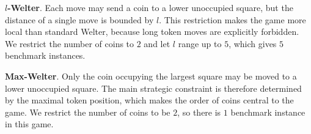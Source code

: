 \documentclass[review]{elsarticle}
\newcommand{\set}[1]{\{ #1 \}}
\newcommand{\tuple}[1]{\langle {#1} \rangle}
\newcommand{\true}{\top}
\newcommand{\statevar}{\mathcal{X}}
\newcommand{\act}{\mathcal{A}}
\newcommand{\constraint}{\mathcal{C}}
\newcommand{\estate}{\mathcal{E}}
\newcommand{\pre}{\mathtt{pre}}
\newcommand{\eff}{\mathtt{eff}}
\begin{document}
\textbf{$l$-Welter}. Each move may send a coin to a lower unoccupied square, but the distance of a single move is bounded by $l$.
This restriction makes the game more local than standard Welter, because long token moves are explicitly forbidden.
We restrict the number of coins to $2$ and let $l$ range up to $5$, which gives $5$ benchmark instances.

\textbf{Max-Welter}. Only the coin occupying the largest square may be moved to a lower unoccupied square.
The main strategic constraint is therefore determined by the maximal token position, which makes the order of coins central to the game.
We restrict the number of coins to be $2$, so there is $1$ benchmark instance in this game.
\end{document}
